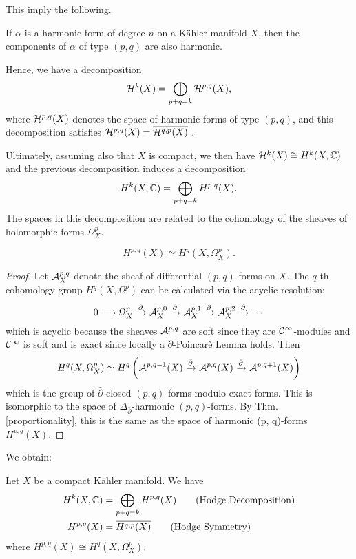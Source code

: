\documentclass[../main.tex]{subfiles}
\begin{document}
This imply the following.

\begin{cor}  \textup{\cite[Cor. 6.9]{Voi07}} If $\alpha$ is a harmonic form of degree $n$ on a K\"{a}hler manifold $X$, then the components of $\alpha$ of type $(p,q)$ are also harmonic.
\end{cor}

Hence, we have a decomposition
\[\mathcal{H}^k(X) = \bigoplus_{p+q=k}\mathcal{H}^{p,q}(X),\]
where $\mathcal{H}^{p,q}(X)$ denotes the space of harmonic forms of type $(p,q)$, and this decomposition satisfies $\mathcal{H}^{p,q}(X) = \overline{\mathcal{H}^{q,p}(X)}$ \cite[Cor. 6.10]{Voi07}.

Ultimately, assuming also that $X$ is compact, we then have $\mathcal{H}^k(X) \cong H^k(X,\mathbb{C})$ and the previous decomposition induces a decomposition 
\[
H^k(X,\mathbb{C}) = \bigoplus_{p+q=k}H^{p,q}(X).
\]
The spaces in this decomposition are related to the cohomology of the sheaves of holomorphic forms  $\Omega^p_X$.
\begin{theorem}  \label{DolbIso} \textup{\cite[Lemma 6.18]{Voi07}}
\[
H^{p,q}(X) \simeq H^q(X,\Omega^p_X).
\]
\end{theorem}
\begin{proof}
Let $\mathcal{A}^{p,q}_X$ denote the sheaf of differential $(p, q)$-forms on $X$. The $q$-th cohomology group $H^q(X,\Omega^p)$ can be calculated via the acyclic resolution:
\[
0 \longrightarrow \Omega^p_X \xrightarrow{\bar \partial}  \mathcal{A}^{p,0}_X \xrightarrow{\bar \partial}  \mathcal{A}^{p,1}_X \xrightarrow{\bar \partial}  \mathcal{A}^{p,2}_X \xrightarrow{\bar \partial} \cdots
\]
which is acyclic because the sheaves $\mathcal{A}^{p,q}$ are soft since they are $\mathcal{C}^\infty$-modules and $\mathcal{C}^\infty$ is soft and is exact since locally a $\bar \partial$-Poincarè Lemma holds.
Then 
\[
H^q(X,\Omega^p_X) \simeq H^q \left( \mathcal{A}^{p,q-1}(X) \xrightarrow{\bar \partial}  \mathcal{A}^{p,q}(X) \xrightarrow{\bar \partial}  \mathcal{A}^{p,q+1}(X) \right)
\]
which is the group of  $\bar \partial$-closed $(p, q)$ forms modulo exact forms. This is isomorphic to the space of $\Delta_{\bar \partial}$-harmonic $(p, q)$-forms.
By Thm. \ref{proportionality}, this is the same as the space of harmonic (p, q)-forms $H^{p,q}(X)$.
\end{proof}

We obtain:

\begin{theorem} \label{hodgedecomp} Let $X$ be a compact K\"{a}hler manifold. We have
\begin{align}
        H^k(X,\mathbb{C}) &= \bigoplus_{p+q=k} H^{p,q}(X) \label{eq:eq1}\tag{Hodge Decomposition} \\
        H^{p,q}(X) &= \overline{H^{q,p}(X)} \label{eq:eq2}\tag{Hodge Symmetry}
\end{align}
where $H^{p,q}(X) \cong H^q(X,\Omega^p_X)$.
\end{theorem}
\end{document}
